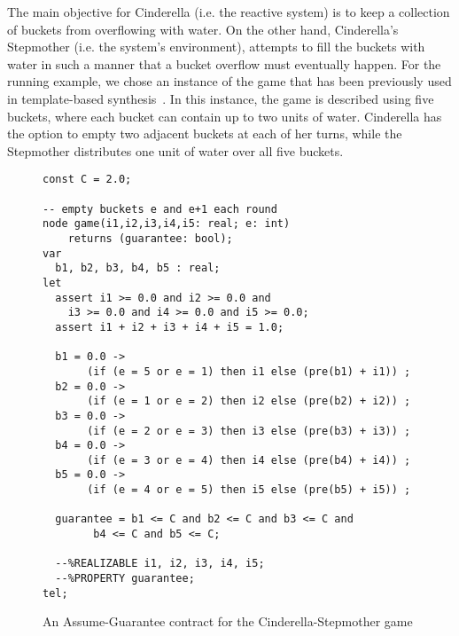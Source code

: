 The main objective for Cinderella (i.e. the reactive system) is to keep a
collection of buckets from overflowing with water. On the other hand,
Cinderella's Stepmother (i.e. the system's environment), attempts to fill the
buckets with water in such a manner that a bucket overflow must eventually
happen.
For the running example, we chose an instance of the game that has been
previously used in template-based synthesis~\cite{beyene2014constraint}. In this instance, the game is described
using five buckets, where each bucket can contain up to two units of water.
Cinderella has the option to empty two adjacent buckets at each of her turns,
while the Stepmother distributes one unit of water over all five buckets.

\begin{figure}[!t]
\centering
 \begin{Verbatim}[fontsize=\scriptsize]
const C = 2.0;

-- empty buckets e and e+1 each round
node game(i1,i2,i3,i4,i5: real; e: int)
	returns (guarantee: bool);
var
  b1, b2, b3, b4, b5 : real;
let
  assert i1 >= 0.0 and i2 >= 0.0 and
 	i3 >= 0.0 and i4 >= 0.0 and i5 >= 0.0;
  assert i1 + i2 + i3 + i4 + i5 = 1.0;

  b1 = 0.0 ->
       (if (e = 5 or e = 1) then i1 else (pre(b1) + i1)) ;
  b2 = 0.0 ->
       (if (e = 1 or e = 2) then i2 else (pre(b2) + i2)) ;
  b3 = 0.0 ->
       (if (e = 2 or e = 3) then i3 else (pre(b3) + i3)) ;
  b4 = 0.0 ->
       (if (e = 3 or e = 4) then i4 else (pre(b4) + i4)) ;
  b5 = 0.0 ->
       (if (e = 4 or e = 5) then i5 else (pre(b5) + i5)) ;

  guarantee = b1 <= C and b2 <= C and b3 <= C and
  	    b4 <= C and b5 <= C;

  --%REALIZABLE i1, i2, i3, i4, i5;
  --%PROPERTY guarantee;
tel;
 \end{Verbatim}
\caption{An Assume-Guarantee contract for the Cinderella-Stepmother game}
\label{fg:cind}
\end{figure}


